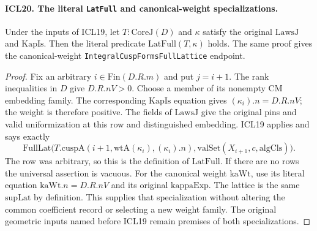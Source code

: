 \paragraph{ICL20. The literal \texttt{LatFull} and canonical-weight specializations.}
\label{claim:ICL20}
Under the inputs of ICL19, let \(T:\mathrm{CoreJ}(D)\)
and \(\kappa\) satisfy the original \(\mathrm{LawsJ}\)
and \(\mathrm{KapIs}\).  Then the literal predicate
\(\mathrm{LatFull}(T,\kappa)\) holds.  The same proof
gives the canonical-weight
\texttt{IntegralCuspFormsFullLattice} endpoint.
\begin{proof}
Fix an arbitrary \(i\in\mathrm{Fin}(D.R.m)\) and
put \(j=i+1\).  The rank inequalities in \(D\)
give \(D.R.nV>0\).  Choose a member of its
nonempty CM embedding family.  The corresponding
\(\mathrm{KapIs}\) equation gives
\((\kappa_i).n=D.R.nV\); the weight is therefore
positive.  The fields of \(\mathrm{LawsJ}\)
give the original pins and valid uniformization
at this row and distinguished embedding.  ICL19
applies and says exactly
\[
 \mathrm{FullLat}\bigl(T.\mathrm{cuspA}(i+1,
                 \mathrm{wtA}(\kappa_i),(\kappa_i).n),
                 \mathrm{valSet}(X_{i+1},c,\mathrm{algCls})\bigr).
\]
The row was arbitrary, so this is the definition
of \(\mathrm{LatFull}\).  If there are no rows the
universal assertion is vacuous.  For the canonical
weight \(\mathrm{kaWt}\), use its literal equation
\(\mathrm{kaWt}.n=D.R.nV\) and its original
\(\mathrm{kappaExp}\).  The lattice is the same
\(\mathrm{supLat}\) by definition.  This supplies
that specialization without altering the common
coefficient record or selecting a new weight family.
The original geometric inputs named before ICL19
remain premises of both specializations.
\end{proof}

